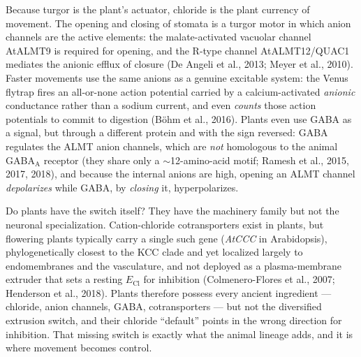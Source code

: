 \documentclass[11pt,a4paper]{article}
\newcommand{\ECl}{E_{\mathrm{Cl}}}
\begin{document}
Because turgor is the plant's actuator, chloride is the plant currency of movement. The opening and closing of stomata is a turgor motor in which anion channels are the active elements: the malate-activated vacuolar channel AtALMT9 is required for opening, and the R-type channel AtALMT12/QUAC1 mediates the anionic efflux of closure (De Angeli et al., 2013; Meyer et al., 2010). Faster movements use the same anions as a genuine excitable system: the Venus flytrap fires an all-or-none action potential carried by a calcium-activated \emph{anionic} conductance rather than a sodium current, and even \emph{counts} those action potentials to commit to digestion (B\"ohm et al., 2016). Plants even use GABA as a signal, but through a different protein and with the sign reversed: GABA regulates the ALMT anion channels, which are \emph{not} homologous to the animal GABA$_{\mathrm{A}}$ receptor (they share only a $\sim$12-amino-acid motif; Ramesh et al., 2015, 2017, 2018), and because the internal anions are high, opening an ALMT channel \emph{depolarizes} while GABA, by \emph{closing} it, hyperpolarizes.

Do plants have the switch itself? They have the machinery family but not the neuronal specialization. Cation-chloride cotransporters exist in plants, but flowering plants typically carry a single such gene (\emph{AtCCC} in Arabidopsis), phylogenetically closest to the KCC clade and yet localized largely to endomembranes and the vasculature, and not deployed as a plasma-membrane extruder that sets a resting $\ECl$ for inhibition (Colmenero-Flores et al., 2007; Henderson et al., 2018). Plants therefore possess every ancient ingredient --- chloride, anion channels, GABA, cotransporters --- but not the diversified extrusion switch, and their chloride ``default'' points in the wrong direction for inhibition. That missing switch is exactly what the animal lineage adds, and it is where movement becomes control.

\FloatBarrier
\end{document}
